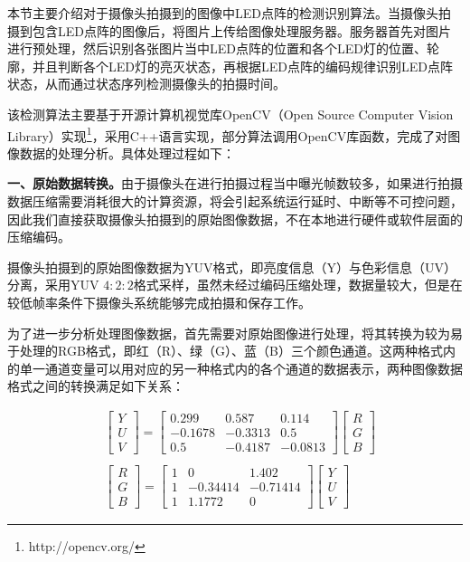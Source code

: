 本节主要介绍对于摄像头拍摄到的图像中LED点阵的检测识别算法。当摄像头拍摄到包含LED点阵的图像后，将图片上传给图像处理服务器。服务器首先对图片进行预处理，然后识别各张图片当中LED点阵的位置和各个LED灯的位置、轮廓，并且判断各个LED灯的亮灭状态，再根据LED点阵的编码规律识别LED点阵状态，从而通过状态序列检测摄像头的拍摄时间。

该检测算法主要基于开源计算机视觉库OpenCV（Open Source Computer Vision Library）实现\footnote{http://opencv.org/}，采用C++语言实现，部分算法调用OpenCV库函数，完成了对图像数据的处理分析。具体处理过程如下：

\textbf{一、原始数据转换。}由于摄像头在进行拍摄过程当中曝光帧数较多，如果进行拍摄数据压缩需要消耗很大的计算资源，将会引起系统运行延时、中断等不可控问题，因此我们直接获取摄像头拍摄到的原始图像数据，不在本地进行硬件或软件层面的压缩编码。

摄像头拍摄到的原始图像数据为YUV格式，即亮度信息（Y）与色彩信息（UV）分离，采用YUV $4:2:2$格式采样，虽然未经过编码压缩处理，数据量较大，但是在较低帧率条件下摄像头系统能够完成拍摄和保存工作。

为了进一步分析处理图像数据，首先需要对原始图像进行处理，将其转换为较为易于处理的RGB格式，即红（R）、绿（G）、蓝（B）三个颜色通道。这两种格式内的单一通道变量可以用对应的另一种格式内的各个通道的数据表示，两种图像数据格式之间的转换满足如下关系\cite{rumball1992method}：

\begin{equation}
\begin{split}
& \left[
\begin{matrix}
Y \\
U \\
V
\end{matrix}
\right]
=
\left[
\begin{matrix}
0.299 & 0.587 & 0.114 \\
-0.1678 & -0.3313 & 0.5 \\
0.5 & -0.4187 & -0.0813
\end{matrix}
\right]
\left[
\begin{matrix}
R \\
G \\
B
\end{matrix}
\right] \\ \\
& \left[
\begin{matrix}
R \\
G \\
B
\end{matrix}
\right]
=
\left[
\begin{matrix}
1 & 0 & 1.402 \\
1 & -0.34414 & -0.71414 \\
1 & 1.1772 & 0
\end{matrix}
\right]
\left[
\begin{matrix}
Y \\
U \\
V
\end{matrix}
\right]
\end{split}
\label{rgb}
\end{equation}

